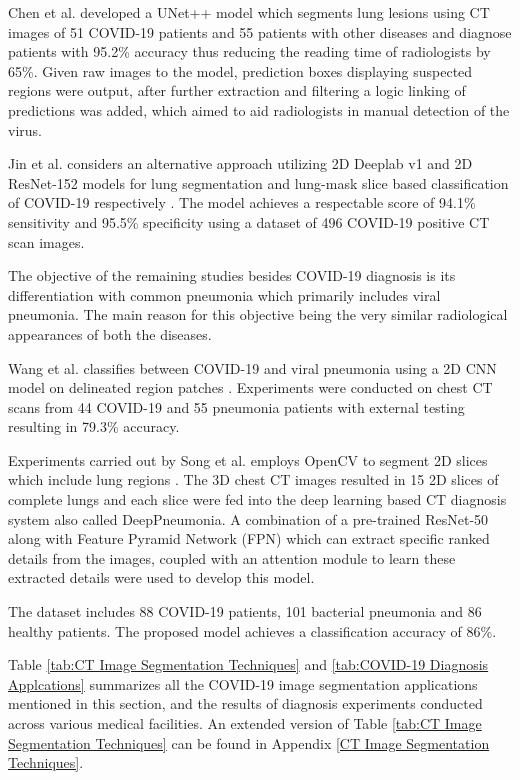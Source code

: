 Chen et al. developed a UNet++ model which segments lung lesions 
\cite{CJL+2020} using CT images of 51 COVID-19 patients and 
55 patients with other diseases and diagnose patients with 95.2\% accuracy thus reducing the reading time of radiologists by 65\%. Given 
raw images to the model, prediction boxes displaying suspected regions were output,
after further extraction and filtering a logic linking of predictions was added, which 
aimed to aid radiologists in manual detection of the virus.

Jin et al. considers an alternative approach  
utilizing 2D Deeplab v1 and 2D ResNet-152 models for lung segmentation 
and lung-mask slice based classification of COVID-19 respectively \cite{JCW+2020}. The 
model achieves a respectable score of 94.1\% sensitivity and 95.5\% 
specificity using a dataset of 496 COVID-19 positive CT scan images.

The objective of the remaining studies besides COVID-19 diagnosis is its differentiation
with common pneumonia which primarily 
includes viral pneumonia. The main reason for this objective being the 
very similar radiological appearances of both the diseases.

Wang et al. classifies between COVID-19 and viral pneumonia using a 2D CNN model on delineated 
region patches \cite{WBX+2020}. Experiments were conducted on chest CT scans from 
44 COVID-19 and 55 pneumonia patients with external testing 
resulting in 79.3\% accuracy.

Experiments carried out by Song et al. employs OpenCV to segment 
2D slices which include lung regions \cite{SZL+2020}. The 3D chest CT images resulted in 
15 2D slices of complete lungs and each slice were fed into the deep learning based CT diagnosis system also called DeepPneumonia. A combination of 
a pre-trained ResNet-50 along with Feature Pyramid Network (FPN) which can 
extract specific ranked details from the images, coupled 
with an attention module to learn these extracted details were used to develop this model.

The dataset includes 88 COVID-19 patients, 101 bacterial pneumonia and 86 
healthy patients. The proposed model achieves a classification accuracy of 86\%.

Table \ref{tab:CT Image Segmentation Techniques} and \ref{tab:COVID-19 Diagnosis Applcations} summarizes all the COVID-19 image segmentation 
applications mentioned in this section,
and the results of diagnosis experiments conducted across various 
medical facilities. An extended version of Table \ref{tab:CT Image Segmentation Techniques} can be found in Appendix \ref{CT Image Segmentation Techniques}.
\vspace{1em}

